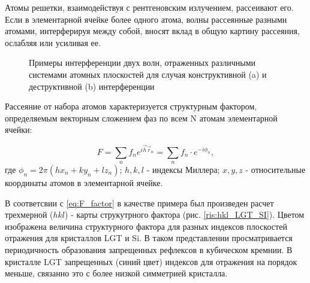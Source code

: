 \label{sec:structure_factor}
Атомы решетки, взаимодействуя с рентгеновским излучением, рассеивают его.
Если в элементарной ячейке более одного атома, волны рассеянные разными атомами,
 интерферируя между собой, вносят вклад в общую картину рассеяния,
 ослабляя или усиливая ее.

 \begin{figure}[H]
   \centering
   \hfill
   \caption{Примеры интерференции двух волн, отраженных различными системами атомных плоскостей для случая
   конструктивной (a) и деструктивной (b) интерференции}
   \label{ris:interference_by_plate}
 \end{figure}

Рассеяние от набора атомов характеризуется структурным фактором, определяемым векторным
 сложением фаз по всем N атомам элементарной ячейки:

 \begin{equation}
   F = \sum_{n} f_n e^{ i\vec{h}\vec{r}_n} =   \sum_{n} f_n \cdot e^{-i\phi_n},
   \label{eq:F_factor}
  \end{equation}
\noindent
где $\phi_n = 2 \pi (hx_n+ky_n+lz_n)$;  $h, k, l$ - индексы Миллера; $x, y, z$ - относительные координаты
атомов в элементарной ячейке.

В соответсвии с \ref{eq:F_factor} в качестве примера был произведен расчет трехмерной ($hkl$) -
карты струкутрного фактора (рис. \ref{ris:hkl_LGT_SI}).
Цветом изображена величина структурного фактора для разных
 индексов плоскостей отражения для кристаллов LGT и Si.
 В таком представлении просматривается периодичность образования запрещенных
 рефлексов в кубическом кремнии. В кристалле LGT запрещенных (синий цвет)
  индексов для отражения на порядок меньше, связанно это с более низкой
  симметрией кристалла.

